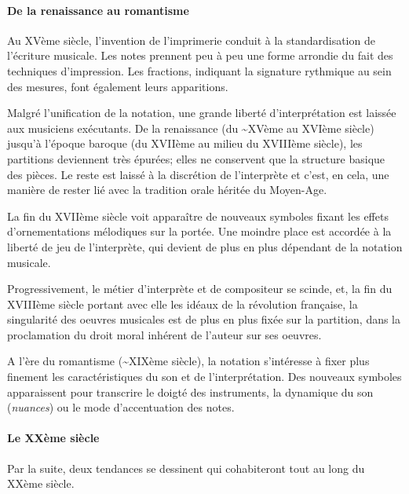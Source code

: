 \paragraph{De la renaissance au romantisme} Au XVème siècle, l'invention de l'imprimerie conduit à la standardisation de l'écriture musicale. Les notes prennent peu à peu une forme arrondie du fait des techniques d'impression. Les fractions, indiquant la signature rythmique au sein des mesures, font également leurs apparitions. 

Malgré l'unification de la notation, une grande liberté d'interprétation est laissée aux musiciens exécutants. De la renaissance (du \textasciitilde XVème au XVIème siècle) jusqu'à l'époque baroque (du XVIIème au milieu du XVIIIème siècle), les partitions deviennent très épurées; elles ne conservent que la structure basique des pièces. Le reste est laissé à la discrétion de l'interprète et c'est, en cela, une manière de rester lié avec la tradition orale héritée du Moyen-Age.


La fin du XVIIème siècle voit apparaître de nouveaux symboles fixant les effets d'ornementations mélodiques sur la portée. Une moindre place est accordée à la liberté de jeu de l'interprète, qui devient de plus en plus dépendant de la notation musicale.

Progressivement, le métier d'interprète et de compositeur se scinde, et, la fin du XVIIIème siècle portant avec elle les idéaux de la révolution française, la singularité des oeuvres musicales est de plus en plus fixée sur la partition, dans la proclamation du droit moral inhérent de l'auteur sur ses oeuvres.

A l'ère du romantisme (\textasciitilde XIXème siècle), la notation s'intéresse à fixer plus finement les caractéristiques du son et de l'interprétation. Des nouveaux symboles apparaissent pour transcrire le doigté des instruments, la dynamique du son (\textit{nuances}) ou le mode d'accentuation des notes.


\paragraph{Le XXème siècle} Par la suite, deux tendances se dessinent qui cohabiteront tout au long du XXème siècle. 

